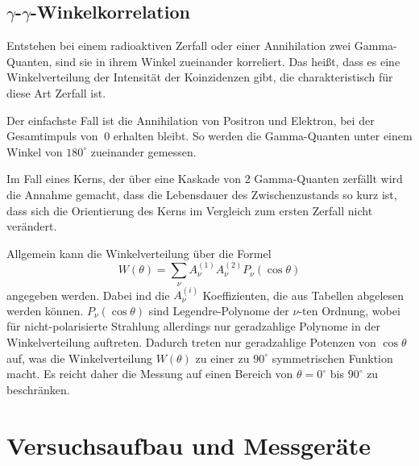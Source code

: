 \documentclass[11pt]{scrartcl}
\begin{document}
\subsection{$\gamma$-$\gamma$-Winkelkorrelation}
Entstehen bei einem radioaktiven Zerfall oder einer Annihilation zwei Gamma-Quanten, sind sie
in ihrem Winkel zueinander korreliert. Das heißt, dass es eine Winkelverteilung der Intensität
der Koinzidenzen gibt, die charakteristisch für diese Art Zerfall ist. 

Der einfachste Fall ist die Annihilation von Positron und Elektron, bei der Gesamtimpuls von $~0$ 
erhalten bleibt. So werden die Gamma-Quanten unter einem Winkel von $180^\circ$ zueinander gemessen.

Im Fall eines Kerns, der über eine Kaskade von 2 Gamma-Quanten zerfällt wird die Annahme gemacht, dass
die Lebensdauer des Zwischenzustands so kurz ist, dass sich die Orientierung des Kerns im Vergleich 
zum ersten Zerfall nicht verändert. 

Allgemein kann die Winkelverteilung über die Formel
\begin{equation}
 W(\theta)=\sum_\nu A_\nu^{(1)} A_\nu^{(2)} P_\nu ( \cos \theta)
\end{equation}
angegeben werden. Dabei ind die $A_\nu^{(i)}$ Koeffizienten, die aus Tabellen abgelesen werden können.
$P_\nu(\cos \theta)$ sind Legendre-Polynome der $\nu$-ten Ordnung, wobei für nicht-polarisierte Strahlung
allerdings nur geradzahlige Polynome in der Winkelverteilung auftreten. Dadurch treten nur geradzahlige
Potenzen von $\cos \theta$ auf, was die Winkelverteilung $W(\theta)$ zu einer zu $90^\circ$ symmetrischen
Funktion macht. Es reicht daher die Messung auf einen Bereich von $\theta=0^\circ$ bis $90^\circ$ zu 
beschränken.

\section{Versuchsaufbau und Messgeräte}
\end{document}
